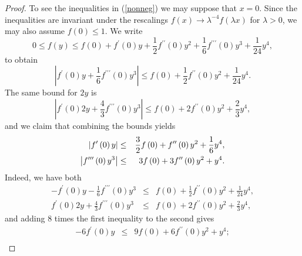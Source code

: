 \documentclass{amsart}
\theoremstyle{plain}
\numberwithin{equation}{section}
\begin{document}
\begin{proof}
To see the inequalities in (\ref{nonneg}) we may suppose that $x=0$. Since
the inequalities are invariant under the rescalings $f\left( x\right)
\rightarrow \lambda ^{-4}f\left( \lambda x\right) $ for $\lambda >0$, we may
also assume $f\left( 0\right) \leq 1$. We write%
\begin{equation*}
0\leq f\left( y\right) \leq f\left( 0\right) +f^{\prime }\left( 0\right) y+%
\frac{1}{2}f^{\prime \prime }\left( 0\right) y^{2}+\frac{1}{6}f^{\prime
\prime \prime }\left( 0\right) y^{3}+\frac{1}{24}y^{4},
\end{equation*}%
to obtain%
\begin{equation*}
\left\vert f^{\prime }\left( 0\right) y+\frac{1}{6}f^{\prime \prime \prime
}\left( 0\right) y^{3}\right\vert \leq f\left( 0\right) +\frac{1}{2}%
f^{\prime \prime }\left( 0\right) y^{2}+\frac{1}{24}y^{4}.
\end{equation*}%
The same bound for $2y$ is%
\begin{equation*}
\left\vert f^{\prime }\left( 0\right) 2y+\frac{4}{3}f^{\prime \prime \prime
}\left( 0\right) y^{3}\right\vert \leq f\left( 0\right) +2f^{\prime \prime
}\left( 0\right) y^{2}+\frac{2}{3}y^{4},
\end{equation*}%
and we claim that combining the bounds yields%
\begin{eqnarray}
\left\vert f^{\prime }\left( 0\right) y\right\vert &\leq &\frac{3}{2}f\left(
0\right) +f^{\prime \prime }\left( 0\right) y^{2}+\frac{1}{6}y^{4},
\label{combining} \\
\left\vert f^{\prime \prime \prime }\left( 0\right) y^{3}\right\vert &\leq
&3f\left( 0\right) +3f^{\prime \prime }\left( 0\right) y^{2}+y^{4}.  \notag
\end{eqnarray}%
Indeed, we have both%
\begin{eqnarray*}
-f^{\prime }\left( 0\right) y-\frac{1}{6}f^{\prime \prime \prime }\left(
0\right) y^{3} &\leq &f\left( 0\right) +\frac{1}{2}f^{\prime \prime }\left(
0\right) y^{2}+\frac{1}{24}y^{4}, \\
f^{\prime }\left( 0\right) 2y+\frac{4}{3}f^{\prime \prime \prime }\left(
0\right) y^{3} &\leq &f\left( 0\right) +2f^{\prime \prime }\left( 0\right)
y^{2}+\frac{2}{3}y^{4},
\end{eqnarray*}%
and adding $8$ times the first inequality to the second gives%
\begin{eqnarray*}
-6f^{\prime }\left( 0\right) y &\leq &9f\left( 0\right) +6f^{\prime \prime
}\left( 0\right) y^{2}+y^{4}; \\

\end{eqnarray*}
\end{proof}
\end{document}
